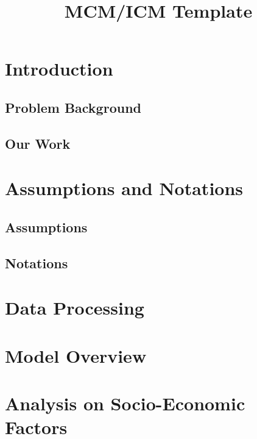 \documentclass[12pt]{article} %
\title{MCM/ICM Template}
\begin{document}
\cfoot{}
\maketitle
\thispagestyle{fancy}
\tableofcontents %
\newpage %

\section{Introduction} %
\subsection{Problem Background} %


\subsection{Our Work} %


\section{Assumptions and Notations} %
\subsection{Assumptions}


\subsection{Notations} %


\section{Data Processing}


\section{Model Overview} %


\section{Analysis on Socio-Economic Factors} 
\end{document}
